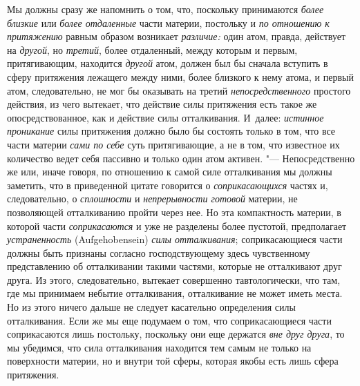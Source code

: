 Мы должны сразу же напомнить о том, что, поскольку принимаются
{\em более близкие} или {\em более
отдаленные} части материи, постольку и {\em по
отношению к притяжению} равным образом возникает
{\em различие:} один атом, правда, действует на {\em другой}, но {\em третий},
более отдаленный, между которым и первым, притягивающим, находится
{\em другой} атом, должен был бы сначала вступить в
сферу притяжения лежащего между ними, более близкого к нему атома, и первый
атом, следовательно, не мог бы оказывать на третий
{\em непосредственного} простого действия, из чего
вытекает, что действие силы притяжения есть такое же опосредствованное, как
и действие силы отталкивания. И~далее: {\em истинное
проникание} силы притяжения должно было бы состоять только в том, что все
части материи {\em сами по себе} суть притягивающие, а
не в том, что известное их количество ведет себя пассивно и только один
атом активен. "--- Непосредственно же или, иначе говоря, по отношению к самой
силе отталкивания мы должны заметить, что в приведенной цитате говорится о
{\em соприкасающихся} частях и, следовательно, о
{\em сплошности} и
{\em непрерывности готовой} материи, не позволяющей
отталкиванию пройти через нее. Но эта компактность материи, в которой части
{\em соприкасаются} и уже не разделены более пустотой,
предполагает {\em устраненность} (Aufgehobensein)
{\em силы отталкивания}; соприкасающиеся части должны
быть признаны согласно господствующему здесь чувственному представлению об
отталкивании такими частями, которые не отталкивают друг друга. Из этого,
следовательно, вытекает совершенно тавтологически, что там, где мы
принимаем небытие отталкивания, отталкивание не может иметь места. Но из
этого ничего дальше не следует касательно определения силы отталкивания.
Если же мы еще подумаем о том, что соприкасающиеся части соприкасаются лишь
постольку, поскольку они еще держатся {\em вне друг
друга}, то мы убедимся, что сила отталкивания находится тем самым не только
на поверхности материи, но и внутри той сферы, которая якобы есть лишь
сфера притяжения.

